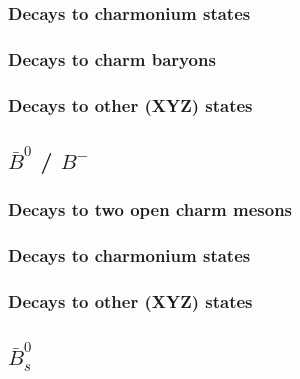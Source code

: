 \subsubsection{Decays to charmonium states}




\subsubsection{Decays to charm baryons}





\subsubsection{Decays to other (XYZ) states}











\subsection{$\bar{B}^0$ / $B^-$}



\subsubsection{Decays to two open charm mesons}




\subsubsection{Decays to charmonium states}










\subsubsection{Decays to other (XYZ) states}






\subsection{$\bar{B}_s^0$}


